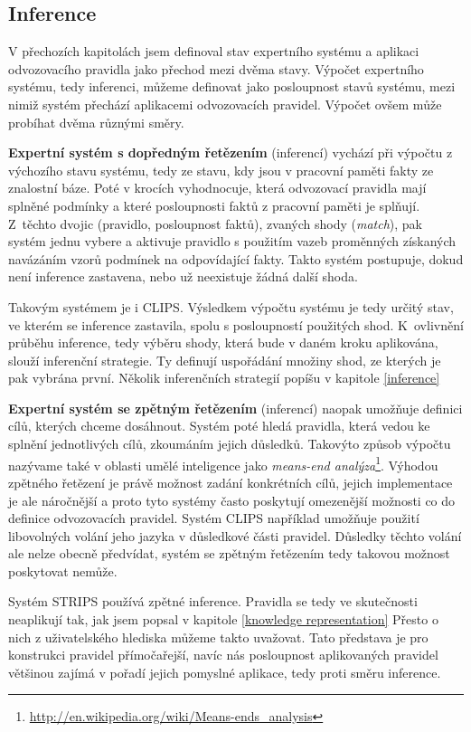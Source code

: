 \subsection{Inference}
\label{theory inference}

V přechozích kapitolách jsem definoval stav expertního systému a aplikaci
odvozovacího pravidla jako přechod mezi dvěma stavy. Výpočet expertního systému,
tedy inferenci, můžeme definovat jako posloupnost stavů systému, mezi nimiž
systém přechází aplikacemi odvozovacích pravidel. Výpočet ovšem může probíhat
dvěma různými směry.

\textbf{Expertní systém s dopředným řetězením} (inferencí) vychází při výpočtu z
výchozího stavu systému, tedy ze stavu, kdy jsou v pracovní paměti fakty ze
znalostní báze. Poté v krocích vyhodnocuje, která odvozovací pravidla mají
splněné podmínky a které posloupnosti faktů z pracovní paměti je splňují.
Z~těchto dvojic (pravidlo, posloupnost faktů), zvaných shody (\emph{match}), pak
systém jednu vybere a aktivuje pravidlo s použitím vazeb proměnných získaných
navázáním vzorů podmínek na odpovídající fakty. Takto systém postupuje, dokud není
inference zastavena, nebo už neexistuje žádná další shoda.

Takovým systémem je i CLIPS. Výsledkem výpočtu systému je tedy určitý stav, ve
kterém se inference zastavila, spolu s posloupností použitých shod. K~ovlivnění
průběhu inference, tedy výběru shody, která bude v daném kroku aplikována,
slouží inferenční strategie. Ty definují uspořádání množiny shod, ze kterých je
pak vybrána první. Několik inferenčních strategií popíšu v kapitole \ref{inference}

\textbf{Expertní systém se zpětným řetězením} (inferencí) naopak umožňuje
definici cílů, kterých chceme dosáhnout. Systém poté hledá pravidla, která
vedou ke splnění jednotlivých cílů, zkoumáním jejich důsledků. Takovýto způsob
výpočtu nazývame také v oblasti umělé inteligence jako \emph{means-end
analýza}\footnote{\url{http://en.wikipedia.org/wiki/Means-ends\_analysis}}.
Výhodou zpětného řetězení je právě možnost zadání konkrétních cílů, jejich
implementace je ale náročnější a proto tyto systémy často poskytují omezenější
možnosti co do definice odvozovacích pravidel. Systém CLIPS například umožňuje
použití libovolných volání jeho jazyka v důsledkové části pravidel. Důsledky
těchto volání ale nelze obecně předvídat, systém se zpětným řetězením tedy
takovou možnost poskytovat nemůže.

Systém STRIPS používá zpětné inference. Pravidla se tedy ve skutečnosti
neaplikují tak, jak jsem popsal v kapitole \ref{knowledge representation} Přesto o
nich z uživatelského hlediska můžeme takto uvažovat. Tato představa je pro
konstrukci pravidel přímočařejší, navíc nás posloupnost aplikovaných pravidel
většinou zajímá v pořadí jejich pomyslné aplikace, tedy proti směru inference.

